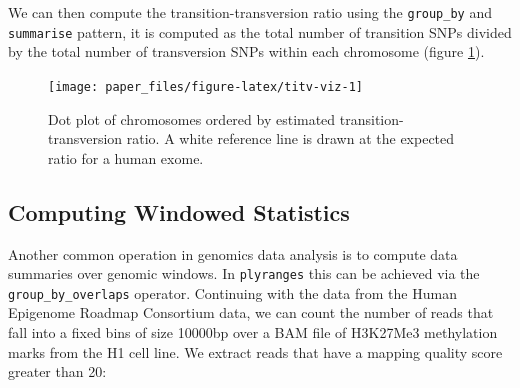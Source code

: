 \documentclass[10pt,letterpaper]{article}
\newenvironment{Shaded}{\begin{snugshade}}{\end{snugshade}}
\newcommand{\KeywordTok}[1]{\textcolor[rgb]{0.13,0.29,0.53}{\textbf{#1}}}
\newcommand{\DataTypeTok}[1]{\textcolor[rgb]{0.13,0.29,0.53}{#1}}
\newcommand{\DecValTok}[1]{\textcolor[rgb]{0.00,0.00,0.81}{#1}}
\newcommand{\StringTok}[1]{\textcolor[rgb]{0.31,0.60,0.02}{#1}}
\newcommand{\OperatorTok}[1]{\textcolor[rgb]{0.81,0.36,0.00}{\textbf{#1}}}
\newcommand{\NormalTok}[1]{#1}
\begin{document}
We can then compute the transition-transversion ratio using the
\texttt{group\_by} and \texttt{summarise} pattern, it is computed as the
total number of transition SNPs divided by the total number of
transversion SNPs within each chromosome (figure \ref{fig:titv-viz}).

\begin{Shaded}
\end{Shaded}

\begin{figure}

{\centering \texttt{[image: paper\_files/figure-latex/titv-viz-1]} 

}

\caption{Dot plot of chromosomes ordered by estimated transition-transversion ratio. A white reference line is drawn at the expected ratio for a human exome.}\label{fig:titv-viz}
\end{figure}

\subsection{Computing Windowed
Statistics}\label{computing-windowed-statistics}

Another common operation in genomics data analysis is to compute data
summaries over genomic windows. In \texttt{plyranges} this can be
achieved via the \texttt{group\_by\_overlaps} operator. Continuing with
the data from the Human Epigenome Roadmap Consortium data, we can count
the number of reads that fall into a fixed bins of size 10000bp over a
BAM file of H3K27Me3 methylation marks from the H1 cell line. We extract
reads that have a mapping quality score greater than 20:

\begin{Shaded}
\end{Shaded}
\end{document}
